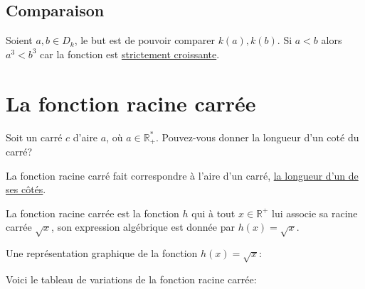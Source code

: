 \documentclass[french]{book}
\begin{document}
\subsection*{Comparaison}
Soient $a,b \in D_k$, le but est de pouvoir comparer $k(a),k(b)$.
Si $a<b$ alors $a^3<b^3$ car la fonction est \underline{strictement croissante}.


\section{La fonction racine carrée}

Soit un carré $c$ d'aire $a$, où $a \in \mathbb{R}_+^*$. Pouvez-vous donner la longueur d'un coté du carré?

La fonction racine carré fait correspondre à l'aire d'un carré, \underline{la longueur d'un de ses côtés}.

\begin{defn}
La fonction racine carrée est la fonction $h$ qui à tout $x \in \mathbb{R}^+$ lui associe sa racine carrée $\sqrt{x}$, son expression algébrique est donnée par $h(x)=\sqrt{x}$.\\
\end{defn}

Une représentation graphique de la fonction $h(x)=\sqrt{x}$:

\begin{center}



\end{center}

Voici le tableau de variations de la fonction racine carrée:
\end{document}
